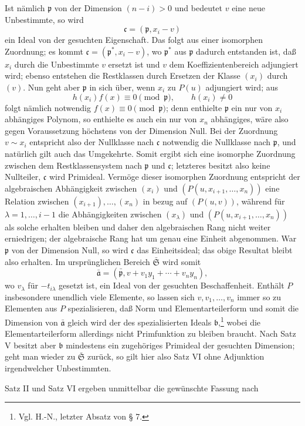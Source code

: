\documentclass[11pt]{article}
\providecommand{\frakS}{\mathfrak S}
\providecommand{\frakp}{\mathfrak p}
\providecommand{\fraka}{\mathfrak a}
\providecommand{\frakb}{\mathfrak b}
\providecommand{\frakc}{\mathfrak c}
\begin{document}
Ist nämlich $\frakp$ von der Dimension $(n-i)>0$ und bedeutet $v$ eine neue Unbestimmte, so wird
\[
 \frakc=(\frakp,x_i-v)
\]
ein Ideal von der gesuchten Eigenschaft. Das folgt aus einer isomorphen Zuordnung; es kommt $\frakc=(\frakp^*,x_i-v)$, wo $\frakp^*$ aus $\frakp$ dadurch entstanden ist, daß $x_i$ durch die Unbestimmte $v$ ersetzt ist und $v$ dem Koeffizientenbereich adjungiert wird; ebenso entstehen die Restklassen durch Ersetzen der Klasse $(x_i)$ durch $(v)$. Nun geht aber $\frakp$ in sich über, wenn $x_i$ zu $P(u)$ adjungiert wird; aus
\[
 h(x_i)f(x)\equiv0\pmod{\frakp},\qquad h(x_i)\ne0
\]
folgt nämlich notwendig $f(x)\equiv0\pmod{\frakp}$; denn enthielte $\frakp$ ein nur von $x_i$ abhängiges Polynom, so enthielte es auch ein nur von $x_n$ abhängiges, wäre also gegen Voraussetzung höchstens von der Dimension Null. Bei der Zuordnung $v\sim x_i$ entspricht also der Nullklasse nach $\frakc$ notwendig die Nullklasse nach $\frakp$, und natürlich gilt auch das Umgekehrte. Somit ergibt sich eine isomorphe Zuordnung zwischen dem Restklassensystem nach $\frakp$ und $\frakc$; letzteres besitzt also keine Nullteiler, $\frakc$ wird Primideal. Vermöge dieser isomorphen Zuordnung entspricht der algebraischen Abhängigkeit zwischen $(x_i)$ und $(P(u,x_{i+1},\ldots,x_n))$ eine Relation zwischen $(x_{i+1}),\ldots,(x_n)$ in bezug auf $(P(u,v))$, während für $\lambda=1,\ldots,i-1$ die Abhängigkeiten zwischen $(x_\lambda)$ und $(P(u,x_{i+1},\ldots,x_n))$ als solche erhalten bleiben und daher den algebraischen Rang nicht weiter erniedrigen; der algebraische Rang hat um genau eine Einheit abgenommen. War $\frakp$ von der Dimension Null, so wird $\frakc$ das Einheitsideal; das obige Resultat bleibt also erhalten. Im ursprünglichen Bereich $\bar{\frakS}$ wird somit
\[
 \bar{\fraka}=(\bar{\frakp},v+v_1y_1+\cdots+v_ny_n),
\]
wo $v_\lambda$ für $-t_{i\lambda}$ gesetzt ist, ein Ideal von der gesuchten Beschaffenheit. Enthält $P$ insbesondere unendlich viele Elemente, so lassen sich $v,v_1,\ldots,v_n$ immer so zu Elementen aus $P$ spezialisieren, daß Norm und Elementarteilerform und somit die Dimension von $\bar{\fraka}$ gleich wird der des spezialisierten Ideals $\frakb$,\footnote{Vgl. H.-N., letzter Absatz von § 7.} wobei die Elementarteilerform allerdings nicht Primfunktion zu bleiben braucht. Nach Satz V besitzt aber $\frakb$ mindestens ein zugehöriges Primideal der gesuchten Dimension; geht man wieder zu $\bar{\frakS}$ zurück, so gilt hier also Satz VI ohne Adjunktion irgendwelcher Unbestimmten.

Satz II und Satz VI ergeben unmittelbar die gewünschte Fassung nach
\end{document}
